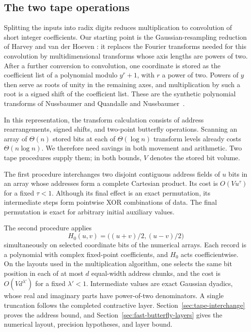 \documentclass[11pt]{article}
\theoremstyle{definition}
\begin{document}
\subsection{The two tape operations}

Splitting the inputs into radix digits reduces multiplication to
convolution of short integer coefficients. Our starting point is the
Gaussian-resampling reduction of Harvey and van der Hoeven
\cite{HarveyHoeven2021}: it replaces the Fourier transforms needed for
this convolution by multidimensional transforms whose axis lengths are
powers of two. After a further conversion to convolution, one coordinate
is stored as the coefficient list of a polynomial modulo $y^r+1$, with $r$ a power of two. Powers of $y$ then
serve as roots of unity in the remaining axes, and multiplication by
such a root is a signed shift of the coefficient list. These are the
synthetic polynomial transforms of Nussbaumer and Quandalle and
Nussbaumer~\cite{NussbaumerQuandalle1978,Nussbaumer1980}.

In this representation, the transform calculation consists of address
rearrangements, signed shifts, and two-point butterfly operations.
Scanning an array of $\Theta(n)$ stored bits at each of
$\Theta(\log n)$ transform levels already costs $\Theta(n\log n)$.
We therefore need savings in both movement and arithmetic. Two tape
procedures supply them; in both bounds, $V$ denotes the stored bit volume.

The first procedure interchanges two disjoint contiguous address fields
of $u$ bits in an array whose addresses form a complete Cartesian
product. Its cost is $O(Vu^\tau)$ for a fixed $\tau<1$.
Although its final effect is an exact permutation, its intermediate
steps form pointwise XOR combinations of data. The final permutation is
exact for arbitrary initial auxiliary values.

The second procedure applies
\[
 H_0(u,v)=\bigl((u+v)/2,(u-v)/2\bigr)
\]
simultaneously on selected coordinate bits of the numerical arrays.
Each record is a polynomial with complex fixed-point coefficients, and
$H_0$ acts coefficientwise. On the layouts used in the multiplication
algorithm, one selects the same bit position in each of at most $d$
equal-width address chunks, and the cost is $O(Vd^{\lambda'})$ for a
fixed $\lambda'<1$. Intermediate values are exact Gaussian dyadics,
whose real and imaginary parts have power-of-two denominators. A single
truncation follows the completed contractive layer.
Section~\ref{sec:tape-interchange} proves the address bound, and
Section~\ref{sec:fast-butterfly-layers} gives the numerical layout,
precision hypotheses, and layer bound.
\end{document}
